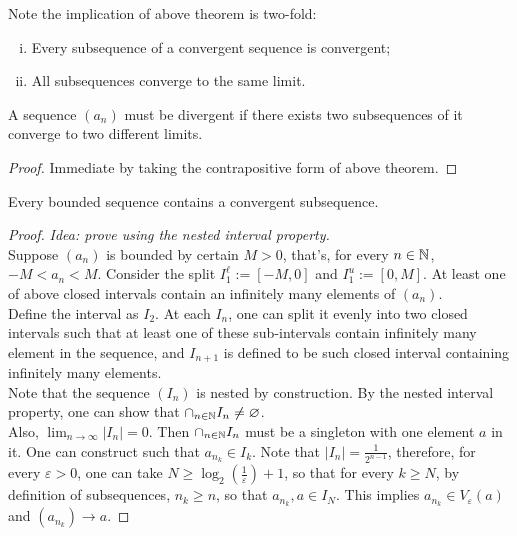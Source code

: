 \documentclass[11pt]{article}
\begin{document}
	\begin{remark}
		Note the implication of above theorem is two-fold:
		\begin{enumerate}[(i)]
			\item Every subsequence of a convergent sequence is convergent;
			\item All subsequences converge to the same limit.
		\end{enumerate}
	\end{remark}
	
	\begin{corollary}
		A sequence $(a_n)$ must be divergent if there exists two subsequences of it converge to two different limits.
	\end{corollary}
	
	\begin{proof}
		Immediate by taking the contrapositive form of above theorem.
	\end{proof}
	
	\begin{theorem}
		Every bounded sequence contains a convergent subsequence.
	\end{theorem}
	
	\begin{proof} \emph{Idea: prove using the nested interval property.} \\
		Suppose $(a_n)$ is bounded by certain $M > 0$, that's, for every $n \in \mathbb{N}$, $-M < a_n < M$. Consider the split $I_1^\ell := [-M, 0]$ and $I_1^u := [0, M]$. At least one of above closed intervals contain an infinitely many elements of $(a_n)$.\\
		Define the interval as $I_2$. At each $I_n$, one can split it evenly into two closed intervals such that at least one of these sub-intervals contain infinitely many element in the sequence, and $I_{n+1}$ is defined to be such closed interval containing infinitely many elements.\\
		Note that the sequence $(I_n)$ is nested by construction. By the nested interval property, one can show that $\cap_{n \in \mathbb{N}} I_n \neq \varnothing$.\\
		Also, $\lim_{n \to \infty} |I_n| = 0$. Then $\cap_{n \in \mathbb{N}} I_n$ must be a singleton with one element $a$ in it. One can construct such that $a_{n_k} \in I_k$. Note that $|I_n| = \frac{1}{2^{n-1}}$, therefore, for every $\varepsilon > 0$, one can take $N \geq \log_2 \left({\frac{1}{\varepsilon}}\right) + 1$, so that for every $k \geq N$, by definition of subsequences, $n_k \geq n$, so that $a_{n_k}, a \in I_N$. This implies $a_{n_k} \in V_{\varepsilon}(a)$ and $(a_{n_k}) \to a$.
	\end{proof}
	
\end{document}
